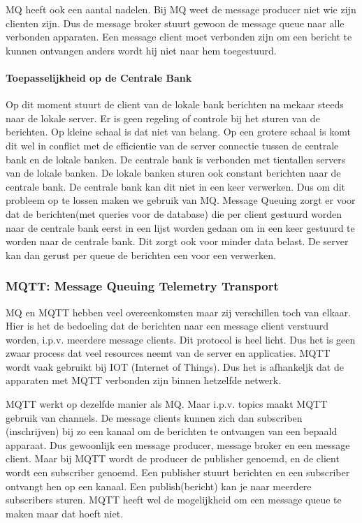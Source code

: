 \documentclass{article}
\begin{document}
MQ heeft ook een aantal nadelen.
Bij MQ weet de message producer niet wie zijn clienten zijn.
Dus de message broker stuurt gewoon de message queue naar alle verbonden apparaten.
Een message client moet verbonden zijn om een bericht te kunnen ontvangen
anders wordt hij niet naar hem toegestuurd. \\

\paragraph{Toepasselijkheid op de Centrale Bank}
Op dit moment stuurt de client van de lokale bank berichten na mekaar steeds naar de lokale server.
Er is geen regeling of controle bij het sturen van de berichten.
Op kleine schaal is dat niet van belang.
Op een grotere schaal is komt dit wel in conflict met de efficientie van
de server connectie tussen de centrale bank en de lokale banken.
De centrale bank is verbonden met tientallen servers van de lokale banken.
De lokale banken sturen ook constant berichten naar de centrale bank.
De centrale bank kan dit niet in een keer verwerken.
Dus om dit probleem op te lossen maken we gebruik van MQ.
Message Queuing zorgt er voor dat de berichten(met queries voor de database)
die per client gestuurd worden naar de centrale bank eerst in een lijst worden gedaan
om in een keer gestuurd te worden naar de centrale bank.
Dit zorgt ook voor minder data belast.
De server kan dan gerust per queue de berichten een voor een verwerken.

\subsubsection{MQTT: Message Queuing Telemetry Transport}
MQ en MQTT hebben veel overeenkomsten maar zij verschillen toch van elkaar.
Hier is het de bedoeling dat de berichten naar een message client verstuurd worden,
i.p.v. meerdere message clients.
Dit protocol is heel licht.
Dus het is geen zwaar process dat veel resources neemt van de server en applicaties.
MQTT wordt vaak gebruikt bij IOT (Internet of Things).
Dus het is afhankeljk dat de apparaten met MQTT verbonden zijn binnen hetzelfde netwerk.

MQTT werkt op dezelfde manier als MQ.
Maar i.p.v. topics maakt MQTT gebruik van channels.
De message clients kunnen zich dan subscriben (inschrijven) bij zo een kanaal
om de berichten te ontvangen van een bepaald apparaat.
Dus gewoonlijk een message producer, message broker
en een message client.
Maar bij MQTT wordt de producer de publisher genoemd,
en de client wordt een subscriber genoemd.
Een publisher stuurt berichten en een subscriber ontvangt hen op een kanaal.
Een publish(bericht) kan je naar meerdere subscribers sturen.
MQTT heeft wel de mogelijkheid om een message queue te maken maar dat hoeft niet.
\end{document}
